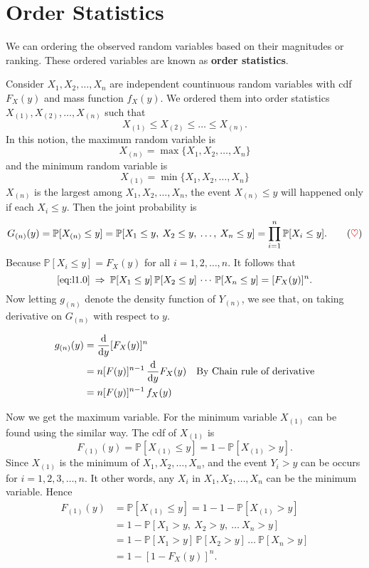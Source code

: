 \section{Order Statistics}

We can ordering the observed random variables based on their magnitudes or ranking. These ordered variables 
are known as \textbf{order statistics}.

Consider $X_1, X_2, \ldots, X_n$ are independent countinuous random variables with cdf $F_X(y)$ and mass function 
$f_X(y)$. We ordered them into order statistics $X_{(1)}, X_{(2)}, \ldots, X_{(n)}$ such that 
\[
X_{(1)} \leq X_{(2)} \leq \ldots \leq X_{(n)}.
\]
In this notion, the maximum random variable is 
\[
    X_{(n)} = \max \{ X_1, X_2, \ldots, X_n \}
\]
and the minimum random variable is 
\[
    X_{(1)} = \min \{ X_1, X_2, \ldots, X_n \}
\]
$X_{(n)}$ is the largest among $X_1, X_2, \ldots, X_n$, the event $X_{(n)} \leq y$ will happened only if each 
$X_i \leq y$. Then the joint probability is
\begin{equation*}
    G_{(n)}(y) = \mathbb{P}[X_{(n)} \leq y] = \mathbb{P}[X_1 \leq y,\> X_2 \leq y,\> \ldots,\> X_n \leq y] = 
    \prod_{i=1}^{n} \mathbb{P}[X_i \leq y]. \label{eq:l1.0} \tag{{\color{red} $\heartsuit$}}
\end{equation*}
Because $\mathbb{P}[X_i \leq y] = F_X(y)$ for all $i=1,2,\ldots,n$. It follows that 
\begin{equation*}
    \eqref{eq:l1.0} \> \Rightarrow \> \mathbb{P}[X_1 \leq y]\,\mathbb{P}[X_2 \leq y]\,\cdots\, \mathbb{P}[X_n \leq y]
    = [F_X(y)]^n.
\end{equation*}
Now letting $g_{(n)}$ denote the density function of $Y_{(n)}$, we see that, on taking derivative on $G_{(n)}$ with respect 
to $y$.

\begin{align*}
    g_{(n)}(y) &= \odv{}{y}[F_X(y)]^n \\
    &= n[F(y)]^{n-1}\, \odv{}{y}F_X(y) & \text{By Chain rule of derivative}\\
    &= n[F(y)]^{n-1}\, f_X(y)
\end{align*}

Now we get the maximum variable. For the minimum variable $X_{(1)}$ can be found using the 
similar way. The cdf of $X_{(1)}$ is 
\[
    F_{(1)}(y) = \mathbb{P}[X_{(1)} \leq y ] = 1 - \mathbb{P}[X_{(1)} > y].
\]
Since $X_{(1)}$ is the minimum of $X_1, X_2, \ldots, X_n$, and the event $Y_i > y$ can be occurs for $i=1,2,3,\ldots,n$. 
It other words, any $X_i$ in $X_1, X_2, \ldots, X_n$ can be the minimum variable. Hence
\begin{align*}
    F_{(1)}(y) &= \mathbb{P}[X_{(1)} \leq y] = 1 - 1 - \mathbb{P}[X_{(1)} > y]\\
    &= 1 - \mathbb{P}[X_1 > y,\> X_2 > y, \> \ldots \> X_n > y]\\
    &= 1 - \mathbb{P}[X_1 > y]\, \mathbb{P}[X_2 > y] \, \ldots \> \mathbb{P}[X_n > y]\\
    &= 1 - [1 - F_X(y)]^n.
\end{align*}

